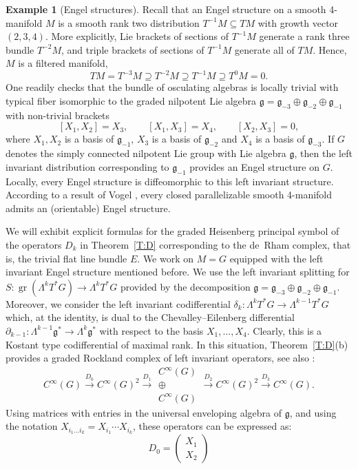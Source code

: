 \documentclass[reqno,12pt]{amsart}
\DeclareMathOperator{\gr}{gr}
\newcommand\goe{\mathfrak g}
\theoremstyle{plain}
\theoremstyle{definition}
\newtheorem{example}[theorem]{Example}
\begin{document}
\begin{example}[Engel structures]\label{Ex:Engel}
Recall that an Engel structure \cite{P16} on a smooth 4-manifold $M$ is a smooth rank two distribution $T^{-1}M\subseteq TM$ with growth vector $(2,3,4)$.
More explicitly, Lie brackets of sections of $T^{-1}M$ generate a rank three bundle $T^{-2}M$, and triple brackets of sections of $T^{-1}M$ generate all of $TM$.
Hence, $M$ is a filtered manifold,
$$
TM=T^{-3}M\supseteq T^{-2}M\supseteq T^{-1}M\supseteq T^0M=0.
$$
One readily checks that the bundle of osculating algebras is locally trivial with typical fiber isomorphic to the graded nilpotent Lie algebra $\goe=\goe_{-3}\oplus\goe_{-2}\oplus\goe_{-1}$ with non-trivial brackets 
$$
[X_1,X_2]=X_3,\qquad [X_1,X_3]=X_4,\qquad [X_2,X_3]=0,
$$ 
where $X_1,X_2$ is a basis of $\goe_{-1}$, $X_3$ is a basis of $\goe_{-2}$ and $X_4$ is a basis of $\goe_{-3}$.
If $G$ denotes the simply connected nilpotent Lie group with Lie algebra $\goe$, then the left invariant distribution corresponding to $\goe_{-1}$ provides an Engel structure on $G$.
Locally, every Engel structure is diffeomorphic to this left invariant structure.
According to a result of Vogel \cite{V09}, every closed parallelizable smooth 4-manifold admits an (orientable) Engel structure.


We will exhibit explicit formulas for the graded Heisenberg principal symbol of the operators $D_k$ in Theorem~\ref{T:D} corresponding to the de~Rham complex, that is, the trivial flat line bundle $E$. 
We work on $M=G$ equipped with the left invariant Engel structure mentioned before.
We use the left invariant splitting for $S\colon\gr(\Lambda^kT^*G)\to\Lambda^kT^*G$ provided by the decomposition $\goe=\goe_{-3}\oplus\goe_{-2}\oplus\goe_{-1}$.
Moreover, we consider the left invariant codifferential $\delta_k\colon\Lambda^kT^*G\to\Lambda^{k-1}T^*G$ which, at the identity, is dual to the Chevalley--Eilenberg differential $\partial_{k-1}\colon\Lambda^{k-1}\goe^*\to\Lambda^k\goe^*$ with respect to the basis $X_1,\dotsc,X_4$. 
Clearly, this is a Kostant type codifferential of maximal rank.
In this situation, Theorem~\ref{T:D}(b) provides a graded Rockland complex of left invariant operators, see also \cite{BENG12}:
\begin{equation}\label{E:DEngel}
C^\infty(G)\xrightarrow{D_0}
C^\infty(G)^2\xrightarrow{D_1}
\begin{array}{c}C^\infty(G)\\\oplus\\ C^\infty(G)\end{array}\xrightarrow{D_2}
C^\infty(G)^2\xrightarrow{D_3}
C^\infty(G).
\end{equation}
Using matrices with entries in the universal enveloping algebra of $\goe$, and using the notation $X_{i_1\dotsc i_k}=X_{i_1}\cdots X_{i_k}$, these operators can be expressed as:
$$
D_0=\left(\begin{array}{c}X_1\\X_2\end{array}\right)
$$


\end{example}
\end{document}

